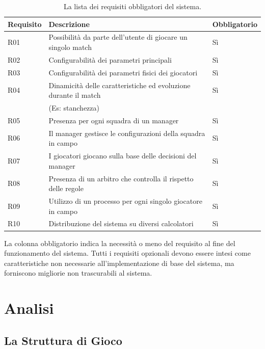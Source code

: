 \documentclass[aps,letterpaper,10pt]{article}
\begin{document}
\begin{table}[H]
\begin{center}
	\begin{tabular}{|l|l|l|}
		\hline
		\textbf{Requisito} & \textbf{Descrizione} & \textbf{Obbligatorio} \\ \hline \hline
		R01 & Possibilit\`a da parte dell'utente di giocare un singolo match & S\`i \\ \hline
		R02 & Configurabilit\`a dei parametri principali & S\`i \\ \hline
		R03 & Configurabilit\`a dei parametri fisici dei giocatori & S\`i \\ \hline
		R04 & Dinamicit\`a delle caratteristiche ed evoluzione durante il match & S\`i \\ 
		& (Es: stanchezza) & \\ \hline
		R05 & Presenza per ogni squadra di un manager & S\`i \\ \hline
		R06 & Il manager gestisce le configurazioni della squadra in campo  & S\`i \\ \hline
		R07 & I giocatori giocano sulla base delle decisioni del manager & S\`i \\ \hline
		R08 & Presenza di un arbitro che controlla il rispetto delle regole & S\`i \\ \hline
		R09 & Utilizzo di un processo per ogni singolo giocatore in campo & S\`i \\ \hline
 		R10 & Distribuzione del sistema su diversi calcolatori & S\`i \\ \hline
		\end{tabular}
\end{center}
\caption{La lista dei requisiti obbligatori del sistema.}
\end{table}

La colonna obbligatorio indica la necessit\`a o meno del requisito al fine del funzionamento del sistema. Tutti i requisiti opzionali devono essere intesi come caratteristiche non necessarie all'implementazione di base del sistema, ma forniscono migliorie non trascurabili al sistema. 

\newpage

\section{Analisi}

\subsection{La Struttura di Gioco}
\end{document}
